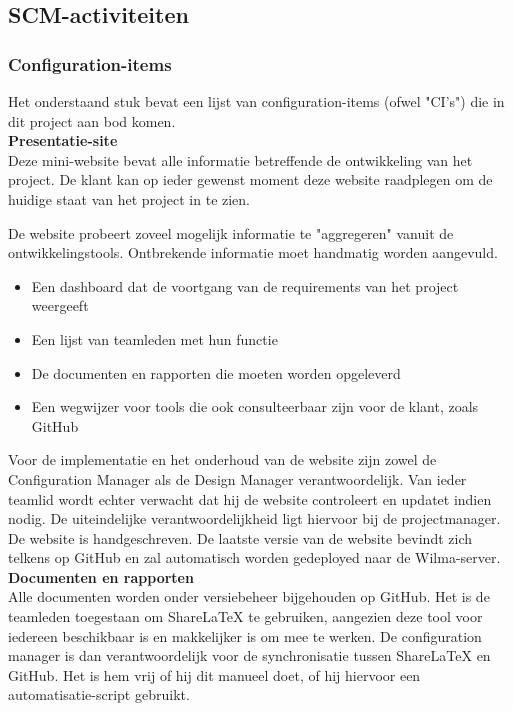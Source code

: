 \subsection{SCM-activiteiten}

\subsubsection{Configuration-items}

Het onderstaand stuk bevat een lijst van configuration-items (ofwel "CI's") die in dit project aan bod komen. \\

\textbf{Presentatie-site} \\

Deze mini-website bevat alle informatie betreffende de ontwikkeling van het project. De klant kan op ieder gewenst moment deze website raadplegen om de huidige staat van het project in te zien.

De website probeert zoveel mogelijk informatie te "aggregeren"  vanuit de ontwikkelingstools. Ontbrekende informatie moet handmatig worden aangevuld. \\

\begin{itemize}
\item Een dashboard dat de voortgang van de requirements van het project weergeeft
\item Een lijst van teamleden met hun functie
\item De documenten en rapporten die moeten worden opgeleverd
\item Een wegwijzer voor tools die ook consulteerbaar zijn voor de klant, zoals GitHub
\end{itemize}

Voor de implementatie en het onderhoud van de website zijn zowel de Configuration Manager als de Design Manager verantwoordelijk. Van ieder teamlid wordt echter verwacht dat hij de website controleert en updatet indien nodig. De uiteindelijke verantwoordelijkheid ligt hiervoor bij de projectmanager. \\

De website is handgeschreven. De laatste versie van de website bevindt zich telkens op GitHub en zal automatisch worden gedeployed naar de Wilma-server. \\

\textbf{Documenten en rapporten} \\

Alle documenten worden onder versiebeheer bijgehouden op GitHub. Het is de teamleden toegestaan om ShareLaTeX te gebruiken, aangezien deze tool voor iedereen beschikbaar is en makkelijker is om mee te werken. De configuration manager is dan verantwoordelijk voor de synchronisatie tussen ShareLaTeX en GitHub. Het is hem vrij of hij dit manueel doet, of hij hiervoor een automatisatie-script gebruikt. \\

